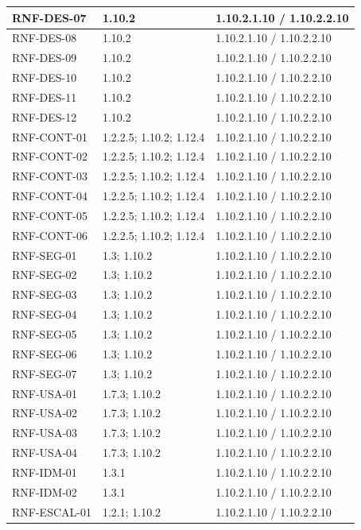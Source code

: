 \begin{longtable}{L{23mm}L{46mm}L{72mm}}
RNF-DES-07 & 1.10.2 & 1.10.2.1.10 / 1.10.2.2.10\\\hline
RNF-DES-08 & 1.10.2 & 1.10.2.1.10 / 1.10.2.2.10\\\hline
RNF-DES-09 & 1.10.2 & 1.10.2.1.10 / 1.10.2.2.10\\\hline
RNF-DES-10 & 1.10.2 & 1.10.2.1.10 / 1.10.2.2.10\\\hline
RNF-DES-11 & 1.10.2 & 1.10.2.1.10 / 1.10.2.2.10\\\hline
RNF-DES-12 & 1.10.2 & 1.10.2.1.10 / 1.10.2.2.10\\\hline
RNF-CONT-01 & 1.2.2.5; 1.10.2; 1.12.4 & 1.10.2.1.10 / 1.10.2.2.10\\\hline
RNF-CONT-02 & 1.2.2.5; 1.10.2; 1.12.4 & 1.10.2.1.10 / 1.10.2.2.10\\\hline
RNF-CONT-03 & 1.2.2.5; 1.10.2; 1.12.4 & 1.10.2.1.10 / 1.10.2.2.10\\\hline
RNF-CONT-04 & 1.2.2.5; 1.10.2; 1.12.4 & 1.10.2.1.10 / 1.10.2.2.10\\\hline
RNF-CONT-05 & 1.2.2.5; 1.10.2; 1.12.4 & 1.10.2.1.10 / 1.10.2.2.10\\\hline
RNF-CONT-06 & 1.2.2.5; 1.10.2; 1.12.4 & 1.10.2.1.10 / 1.10.2.2.10\\\hline
RNF-SEG-01 & 1.3; 1.10.2 & 1.10.2.1.10 / 1.10.2.2.10\\\hline
RNF-SEG-02 & 1.3; 1.10.2 & 1.10.2.1.10 / 1.10.2.2.10\\\hline
RNF-SEG-03 & 1.3; 1.10.2 & 1.10.2.1.10 / 1.10.2.2.10\\\hline
RNF-SEG-04 & 1.3; 1.10.2 & 1.10.2.1.10 / 1.10.2.2.10\\\hline
RNF-SEG-05 & 1.3; 1.10.2 & 1.10.2.1.10 / 1.10.2.2.10\\\hline
RNF-SEG-06 & 1.3; 1.10.2 & 1.10.2.1.10 / 1.10.2.2.10\\\hline
RNF-SEG-07 & 1.3; 1.10.2 & 1.10.2.1.10 / 1.10.2.2.10\\\hline
RNF-USA-01 & 1.7.3; 1.10.2 & 1.10.2.1.10 / 1.10.2.2.10\\\hline
RNF-USA-02 & 1.7.3; 1.10.2 & 1.10.2.1.10 / 1.10.2.2.10\\\hline
RNF-USA-03 & 1.7.3; 1.10.2 & 1.10.2.1.10 / 1.10.2.2.10\\\hline
RNF-USA-04 & 1.7.3; 1.10.2 & 1.10.2.1.10 / 1.10.2.2.10\\\hline
RNF-IDM-01 & 1.3.1 & 1.10.2.1.10 / 1.10.2.2.10\\\hline
RNF-IDM-02 & 1.3.1 & 1.10.2.1.10 / 1.10.2.2.10\\\hline
RNF-ESCAL-01 & 1.2.1; 1.10.2 & 1.10.2.1.10 / 1.10.2.2.10\\\hline

\end{longtable}
